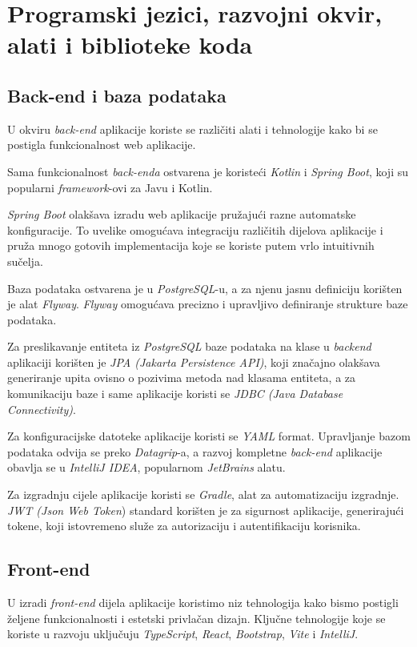		
		\section{Programski jezici, razvojni okvir, alati i biblioteke koda}
		
		
		\subsection{Back-end i baza podataka}
		U okviru \textit{back-end} aplikacije koriste se različiti alati i tehnologije kako bi se postigla funkcionalnost web aplikacije. 
		
		Sama funkcionalnost \textit{back-enda} ostvarena je koristeći \textit{Kotlin} i \textit{Spring Boot}, koji su popularni \textit{framework}-ovi za Javu i Kotlin.
		
		\textit{Spring Boot} olakšava izradu web aplikacije pružajući razne automatske konfiguracije. To uvelike omogućava integraciju različitih dijelova aplikacije i pruža mnogo gotovih implementacija koje se koriste putem vrlo intuitivnih sučelja.
		
		Baza podataka ostvarena je u \textit{PostgreSQL}-u, a za njenu jasnu definiciju korišten je alat \textit{Flyway}. \textit{Flyway} omogućava precizno i upravljivo definiranje strukture baze podataka.
		
		Za preslikavanje entiteta iz \textit{PostgreSQL} baze podataka na klase u \textit{backend} aplikaciji korišten je \textit{JPA (Jakarta Persistence API)}, koji značajno olakšava generiranje upita ovisno o pozivima metoda nad klasama entiteta, a za komunikaciju baze i same aplikacije koristi se \textit{JDBC (Java Database Connectivity)}.
		
		Za konfiguracijske datoteke aplikacije koristi se \textit{YAML} format. Upravljanje bazom podataka odvija se preko \textit{Datagrip}-a, a razvoj kompletne \textit{back-end} aplikacije obavlja se u \textit{IntelliJ IDEA}, popularnom \textit{JetBrains} alatu. 
		
		Za izgradnju cijele aplikacije koristi se \textit{Gradle}, alat za automatizaciju izgradnje. 
\textit{JWT (Json Web Token}) standard korišten je za sigurnost aplikacije, generirajući tokene, koji istovremeno služe za autorizaciju i autentifikaciju korisnika.


			\subsection{Front-end}
			U izradi \textit{front-end} dijela aplikacije koristimo niz tehnologija kako bismo postigli željene funkcionalnosti i estetski privlačan dizajn. Ključne tehnologije koje se koriste u razvoju uključuju \textit{TypeScript}, \textit{React}, \textit{Bootstrap}, \textit{Vite} i \textit{IntelliJ}.
			
